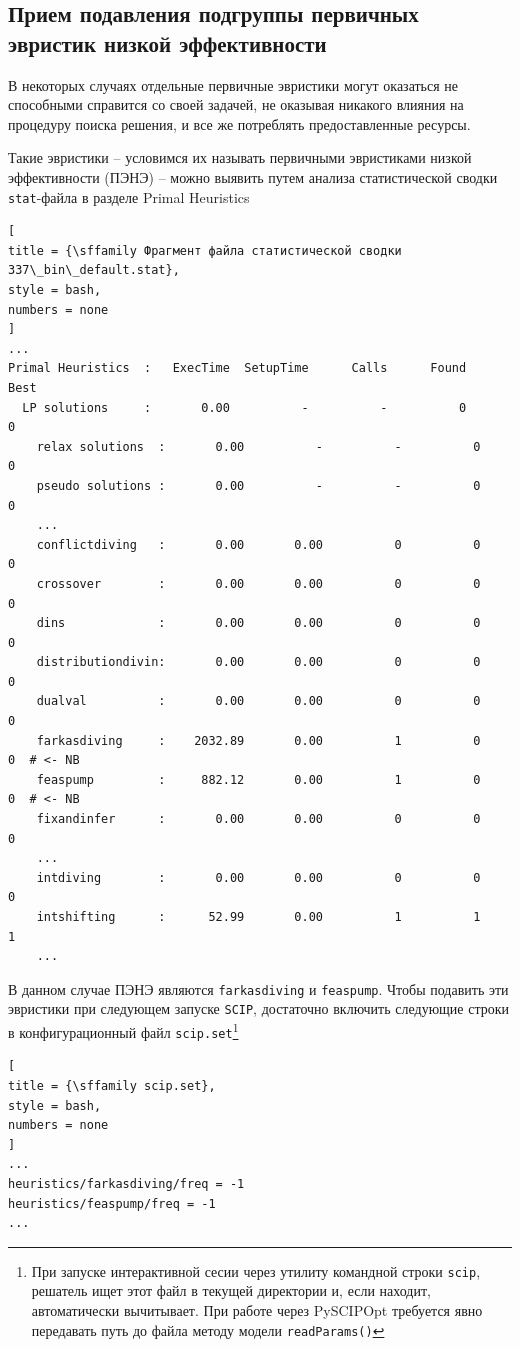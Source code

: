\documentclass[%
	11pt,
	a4paper,
	utf8,
		]{article}
\begin{document}
\subsection{Прием подавления подгруппы первичных эвристик низкой эффективности}\label{sec:suh}

В некоторых случаях отдельные первичные эвристики могут оказаться не способными справится со своей задачей, не оказывая никакого влияния на процедуру поиска решения, и все же потреблять предоставленные ресурсы.

Такие эвристики -- условимся их называть первичными эвристиками низкой эффективности (ПЭНЭ) -- можно выявить путем анализа статистической сводки \verb|stat|-файла в разделе Primal Heuristics
\begin{lstlisting}[
title = {\sffamily Фрагмент файла статистической сводки 337\_bin\_default.stat},
style = bash,
numbers = none
]
...
Primal Heuristics  :   ExecTime  SetupTime      Calls      Found       Best
  LP solutions     :       0.00          -          -          0          0
	relax solutions  :       0.00          -          -          0          0
	pseudo solutions :       0.00          -          -          0          0
	...
	conflictdiving   :       0.00       0.00          0          0          0
	crossover        :       0.00       0.00          0          0          0
	dins             :       0.00       0.00          0          0          0
	distributiondivin:       0.00       0.00          0          0          0
	dualval          :       0.00       0.00          0          0          0
	farkasdiving     :    2032.89       0.00          1          0          0  # <- NB
	feaspump         :     882.12       0.00          1          0          0  # <- NB
	fixandinfer      :       0.00       0.00          0          0          0
	...
	intdiving        :       0.00       0.00          0          0          0
	intshifting      :      52.99       0.00          1          1          1
	...
\end{lstlisting}

В данном случае ПЭНЭ являются \texttt{farkasdiving} и \texttt{feaspump}. Чтобы подавить эти эвристики при следующем запуске \texttt{SCIP}, достаточно включить следующие строки в конфигурационный файл \texttt{scip.set}\footnote{При запуске интерактивной сесии через утилиту командной строки \texttt{scip}, решатель ищет этот файл в текущей директории и, если находит, автоматически вычитывает. При работе через PySCIPOpt требуется явно передавать путь до файла методу модели \texttt{readParams()}}
\begin{lstlisting}[
title = {\sffamily scip.set},
style = bash,
numbers = none
]
...
heuristics/farkasdiving/freq = -1
heuristics/feaspump/freq = -1
...
\end{lstlisting}
\end{document}
